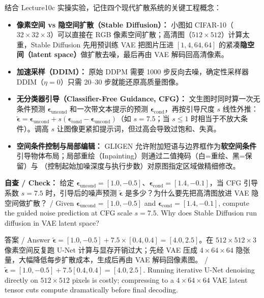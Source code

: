结合 Lecture10c 实操实验，记住四个现代扩散系统的关键工程概念：
\begin{itemize}
\item \textbf{像素空间 vs 隐空间扩散（Stable Diffusion）：} 小图如 CIFAR-10（$32\times 32\times 3$）可以直接在 RGB 像素空间扩散；高清图（$512\times 512$）计算太重，Stable Diffusion 先用预训练 VAE 把图片压进 $[1, 4, 64, 64]$ 的紧凑\textbf{隐空间（latent space）}做扩散去噪，最后再由 VAE 解码回高清像素。
\item \textbf{加速采样（DDIM）：} 原始 DDPM 需要 1000 步反向去噪，确定性采样器 DDIM（$\eta=0$）只需 20–30 步就能还原高质量图像。
\item \textbf{无分类器引导（Classifier-Free Guidance, CFG）：} 文生图时同时算一次无条件预测 $\boldsymbol{\epsilon}_{\text{uncond}}$ 和一次带文本提示的预测 $\boldsymbol{\epsilon}_{\text{cond}}$，再按引导尺度 $s$ 线性外推：$\tilde{\boldsymbol{\epsilon}} = \boldsymbol{\epsilon}_{\text{uncond}} + s(\boldsymbol{\epsilon}_{\text{cond}} - \boldsymbol{\epsilon}_{\text{uncond}})$（如 $s=7.5$；当 $s\le 1$ 时相当于不放大条件）。调高 $s$ 让图像更紧扣提示词，但过高会导致过饱和、失真。
\item \textbf{空间条件控制与局部编辑：} GLIGEN 允许附加短语与边界框作为\textbf{软空间条件}引导物体布局；局部重绘（Inpainting）则通过二值掩码（白=重绘、黑=保留）与 （控制起始加噪深度与执行步数）对原图指定区域做精细修改。
\end{itemize}

\textbf{自查 / Check：} 给定 $\boldsymbol{\epsilon}_{\text{uncond}}=[1.0,-0.5]$、$\boldsymbol{\epsilon}_{\text{cond}}=[1.4,-0.1]$，当 CFG 引导系数 $s=7.5$ 时，引导后的噪声预测 $\tilde{\boldsymbol{\epsilon}}$ 是多少？为什么要先把高清图放进 VAE 隐空间做扩散？ / Given $\boldsymbol{\epsilon}_{\text{uncond}}=[1.0,-0.5]$ and $\boldsymbol{\epsilon}_{\text{cond}}=[1.4,-0.1]$, compute the guided noise prediction at CFG scale $s=7.5$. Why does Stable Diffusion run diffusion in VAE latent space?

\begin{StudySolution}{答案 / Answer}
$\tilde{\boldsymbol{\epsilon}} = [1.0,-0.5] + 7.5\times [0.4, 0.4] = [4.0, 2.5]$。在 $512\times 512\times 3$ 像素空间反复跑 U-Net 计算与显存开销过大；先经 VAE 压成 $4\times 64\times 64$ 隐张量，大幅降低每步扩散成本，生成后再由 VAE 解码回像素图。 / $\tilde{\boldsymbol{\epsilon}} = [1.0,-0.5] + 7.5[0.4,0.4] = [4.0,2.5]$. Running iterative U-Net denoising directly on $512\times 512$ pixels is costly; compressing to a $4\times 64\times 64$ VAE latent tensor cuts compute dramatically before final decoding.
\end{StudySolution}

